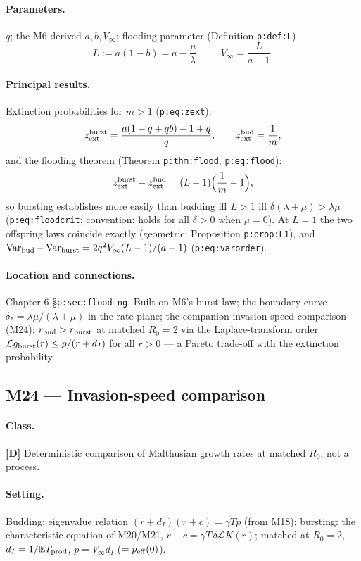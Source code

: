 \documentclass[11pt,a4paper]{article}
\newcommand{\EX}{\mathbb{E}}
\newcommand{\Var}{\operatorname{Var}}
\newcommand{\Lap}{\mathcal{L}}      %
\begin{document}
\paragraph{Parameters.} $q$; the M6-derived $a,b,V_\infty$; flooding
parameter (Definition \texttt{p:def:L})
\[
L:=a(1-b)=a-\frac{\mu}{\lambda},\qquad V_\infty=\frac{L}{a-1}.
\]

\paragraph{Principal results.} Extinction probabilities for $m>1$
(\texttt{p:eq:zext}):
\[
z_{\rm ext}^{\rm burst}=\frac{a(1-q+qb)-1+q}{q},\qquad
z_{\rm ext}^{\rm bud}=\frac1m,
\]
and the flooding theorem (Theorem \texttt{p:thm:flood},
\texttt{p:eq:flood}):
\[
z_{\rm ext}^{\rm burst}-z_{\rm ext}^{\rm bud}=(L-1)\Bigl(\frac1m-1\Bigr),
\]
so bursting establishes more easily than budding iff $L>1$ iff
$\delta(\lambda+\mu)>\lambda\mu$ (\texttt{p:eq:floodcrit}; convention: holds
for all $\delta>0$ when $\mu=0$). At $L=1$ the two offspring laws coincide
exactly (geometric; Proposition \texttt{p:prop:L1}), and
$\Var_{\rm bud}-\Var_{\rm burst}=2q^2V_\infty(L-1)/(a-1)$
(\texttt{p:eq:varorder}).

\paragraph{Location and connections.} Chapter 6
\S\texttt{p:sec:flooding}. Built on M6's burst law; the boundary curve
$\delta_*=\lambda\mu/(\lambda+\mu)$ in the rate plane; the companion
invasion-speed comparison (M24): $r_{\rm bud}>r_{\rm burst}$ at matched
$R_0=2$ via the Laplace-transform order $\Lap g_{\rm burst}(r)\le
p/(r+d_I)$ for all $r>0$ --- a Pareto trade-off with the extinction
probability.

\subsection{M24 --- Invasion-speed comparison \quad [D]}

\paragraph{Class.} \textbf{[D]} Deterministic comparison of Malthusian
growth rates at matched $R_0$; not a process.

\paragraph{Setting.} Budding: eigenvalue relation
$(r+d_I)(r+c)=\gamma Tp$ (from M18); bursting: the characteristic equation
of M20/M21, $r+c=\gamma T\,\delta\Lap K(r)$; matched at $R_0=2$,
$d_I=1/\EX{T_{\rm prod}}$, $p=V_\infty d_I$ ($=p_{\rm eff}(0)$).
\end{document}
